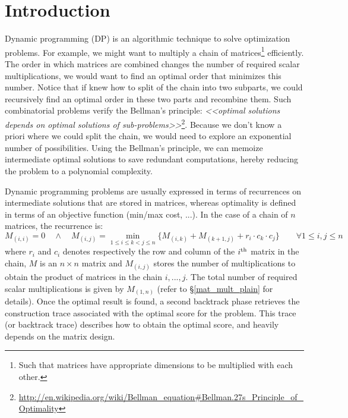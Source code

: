 \newpage
\setcounter{tocdepth}{2} \tableofcontents
\newpage
\section{Introduction} \label{intro}
Dynamic programming (DP) is an algorithmic technique to solve optimization problems. For example, we might want to multiply a chain of matrices\footnote{Such that matrices have appropriate dimensions to be multiplied with each other.} efficiently. The order in which matrices are combined changes the number of required scalar multiplications, we would want to find an optimal order that minimizes this number. Notice that if knew how to split of the chain into two subparts, we could recursively find an optimal order in these two parts and recombine them. Such combinatorial problems verify the Bellman's principle\cite{bellman_principle}: \textit{<<optimal solutions depends on optimal solutions of sub-problems>>}\footnote{\url{http://en.wikipedia.org/wiki/Bellman\_equation\#Bellman.27s\_Principle\_of\_Optimality}}. Because we don't know a priori where we could split the chain, we would need to explore an exponential number of possibilities. Using the Bellman's principle, we can memoize intermediate optimal solutions to save redundant computations, hereby reducing the problem to a polynomial complexity.

Dynamic programming problems are usually expressed in terms of recurrences on intermediate solutions that are stored in matrices, whereas optimality is defined in terms of an objective function (min/max cost, ...). In the case of a chain of $n$ matrices, the recurrence is:
	\[M_{(i,i)}=0 \quad\land\quad M_{(i,j)}=\min_{1\le i\le k<j\le n}\{M_{(i,k)}+M_{(k+1,j)}+r_i \cdot c_k \cdot c_j\} \qquad \forall 1\le i,j\le n\]
where $r_i$ and $c_i$ denotes respectively the row and column of the $i^{\rm th}$ matrix in the chain, $M$ is an $n \times n$ matrix and $M_{(i,j)}$ stores the number of multiplications to obtain the product of matrices in the chain $i,...,j$. The total number of required scalar multiplications is given by $M_{(1,n)}$ (refer to \S\ref{mat_mult_plain} for details). Once the optimal result is found, a second backtrack phase retrieves the construction trace associated with the optimal score for the problem. This trace (or backtrack trace) describes how to obtain the optimal score, and heavily depends on the matrix design.

